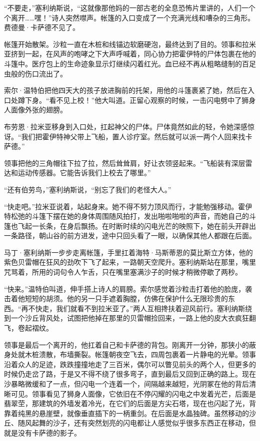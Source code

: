 \documentclass[AutoFakeBold=true]{book}
\begin{document}
``不要走，''塞利纳斯说，``这就像那他妈的一部古老的全息恐怖片里讲的，人们一个个离开……嘿！''诗人突然噤声。帐篷的入口变成了一个充满光线和嘈杂的三角形。费德曼·卡萨德不见了。

\vspace*{1em}

帐篷开始散架。沙粒一直在木桩和线锚边软磨硬泡，最终达到了目的。领事和拉米亚挤到一起，在风声的咆哮之下大声呼喊着，同心协力把霍伊特的尸体包裹在他的斗篷中。医疗包上的生命迹象显示灯继续闪着红光。血已经不再从粗略缝制的百足虫般的伤口流出了。

索尔·温特伯把他四天大的孩子放进胸前的托架，用他的斗篷裹紧了她，然后在入口处蹲下身。``看不见上校！''他大叫道。正留心观察的时候，一击闪电劈中了狮身人面像外张的翅膀。

布劳恩·拉米亚移身到入口处，扛起神父的尸体。尸体竟然如此的轻，令她深感惊讶。``我们把霍伊特神父带上飞船，置人诊疗室。然后就可以派一两个人回来找卡萨德。''

领事把他的三角帽往下拉了拉，然后耸耸肩，好让衣领竖起来。``飞船装有深层雷达和运动传感器。它能告诉我们上校去了哪里。''

``还有伯劳鸟，''塞利纳斯说，``别忘了我们的老怪大人。''

``快走吧。''拉米亚说着，站起身来。她不得不努力顶风而行，才能勉强移动。霍伊特松弛的斗篷下摆在她的身体周围随风拍打，发出啪啦啪啦的声音，而她自己的斗篷也飞起一长条，在身后飘扬。在时断时续的闪电光芒的映照下，她在前头开辟出一条路径，朝山谷的前方进发，途中只回头看了一眼，以确保其他人都跟在后面。

马丁·塞利纳斯一步步走离帐篷，手里扛着海特·马斯蒂恩的莫比斯立方体，他的紫色贝雷帽在狂风的劲吹下飞了起来，一路朝天空爬升。塞利纳斯站在那里，嘴里咒骂着，所用的词句令人乍舌，只在嘴里塞满沙子的时候才稍微停歇了两秒。

``快来。''温特伯叫道，伸手搭上诗人的肩膀。索尔感觉着沙粒击打着他的脸庞，袭击着他短短的胡须。他的另一只手遮着胸膛，仿佛在保护什么无限珍贵的东西。``再不快走，我们就看不到拉米亚了。''两人互相搀扶着迎风前行。塞利纳斯绕到一个沙丘背风处，试图把他掉在那里的贝雷帽捡回来，一路上他的皮大衣疯狂翻飞，卷起褶纹。

领事是最后一个离开的，他扛着自己和卡萨德的背包。刚离开一分钟，那狭小的蔽身处就木桩溃散，布墙撕裂。帐篷朝夜空飞去，四周包裹着一片静电的光晕。领事沿着众人的足迹，跌跌撞撞地走了三百米，偶尔可以瞥见前头的两个人，但更多的时候仍走岔了路，于是又不得不绕了很多弯子，直到最后又回到正确的路上。现在沙暴略微缓和了一点，但闪电一个连着一个，间隔越来越短，光阴冢在他的背后清晰可见。领事看见了狮身人面像，它依旧在不停闪耀的闪电之中发着光芒，后面是翡翠茔，那建筑的外墙发着冷光，在它们的后面是方尖石塔，现在也闪起了光，背靠着纯黑的悬崖壁，就像垂直插下的一柄重剑。在后面是水晶独碑。虽然移动的沙丘、随风起舞的沙子，还有突然划亮的闪电都让人感觉似乎很多东西正在移动，但就是没有卡萨德的影子。
\end{document}

